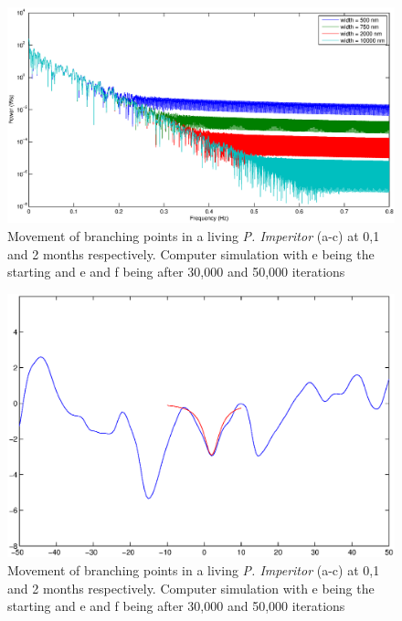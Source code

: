 \message{ !name(report.tex)}\documentclass[]{article}
\begin{document}
\begin{figure}
\centering
\includegraphics[width=\textwidth]{Fouriers_with_varying_range.eps}
\caption{Movement of branching points in a living \emph{P. Imperitor} (a-c) at 0,1 and 2 months respectively.
Computer simulation with e being the starting and e and f being after 30,000 and 50,000 iterations \label{branching}}
\end{figure}

\begin{figure}
\centering
\includegraphics[width=\textwidth]{lorentzianOnLandscape.eps}
\caption{Movement of branching points in a living \emph{P. Imperitor} (a-c) at 0,1 and 2 months respectively.
Computer simulation with e being the starting and e and f being after 30,000 and 50,000 iterations \label{branching}}
\end{figure}
\end{document}
